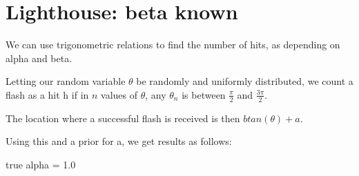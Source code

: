 \documentclass[english]{scrartcl}
\begin{document}
\section{Lighthouse: beta known}
\par We can use trigonometric relations to find the number of hits, as depending on alpha and beta.
\par Letting our random variable $\theta$ be randomly and uniformly distributed, we count a flash as a hit h if in $n$ values of $\theta$, any $\theta_n$ is between $\frac{\pi}{2}$ and $\frac{3\pi}{2}$. 
\par The location where a successful flash is received is then $btan(\theta)+a$.
\par Using this and a prior for a, we get results as follows:
\newpage
\par true alpha = 1.0
\end{document}
